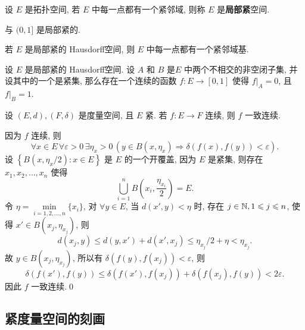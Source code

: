      \begin{Definition}[局部紧]\label{def:局部紧}
           设 $ E $ 是拓扑空间, 若 $ E $ 中每一点都有一个紧邻域, 则称 $ E $ 是\textbf{局部紧}空间.
     \end{Definition}

     \begin{Example}
          \R 与 $ (0, 1] $ 是局部紧的.
     \end{Example}

     \begin{Remark}
          若 $ E $ 是局部紧的 Hausdorff空间, 则 $ E $ 中每一点都有一个紧邻域基.
     \end{Remark}

     \begin{Theorem}[Urysohn引理]
           设 $ E $ 是局部紧的 Hausdorff空间. 设 $ A $ 和 $ B $ 是$ E $ 中两个不相交的非空闭子集, 并设其中的一个是紧集, 那么存在一个连续的函数 $ f:E\to[0,1] $ 使得 $ f|_{A}=0 $, 且 $ f|_{B}=1 $.
     \end{Theorem}

     \begin{Theorem}
           设 $ (E, d), (F, \delta) $ 是度量空间, 且 $ E $ 紧. 若 $ f:E\to F $ 连续, 则 $ f $ 一致连续.
     \end{Theorem}

     \begin{Proof}
          因为 $ f $ 连续, 则 
          \[
               \forall x\in E\,\forall \varepsilon>0\,\exists\eta_{x}>0\,(y\in B(x, \eta_{x})\Rightarrow \delta(f(x), f(y))<\varepsilon).
          \]
          设 $\left\{ B(x, \eta_{x}/2) : x\in E \right\}$ 是 $ E $ 的一个开覆盖, 因为 $ E $ 是紧集, 则存在 $ x_{1}, x_{2},\dots,x_{n} $ 使得
          \[
               \bigcup_{i=1}^{n} B\left(x_{i}, \frac{\eta_{x_{i}}}{2}\right)=E.
          \]
          令 $ \eta=\min\limits_{i=1, 2, \dots, n}\{ x_{i} \} $, 对 $ \forall y\in E $, 当 $ d(x', y)<\eta $ 时, 存在 $ j\in\mathbb{N}, 1\leqslant j\leqslant n $, 使得 $ x'\in B(x_{j}, \eta_{x_{j}}) $, 则
          \[
               d(x_{j}, y) \leqslant d(y, x')+d(x', x_{j})\leqslant\eta_{x_{j}}/2+\eta<\eta_{x_{j}}.
          \]
          故 $ y\in B(x_{j}, \eta_{x_{j}}) $, 所以有 $ \delta(f(y), f(x_{j}))<\varepsilon $, 则
          \[
               \delta(f(x'), f(y))\leqslant \delta(f(x'), f(x_{j}))+\delta(f(x_{j}), f(y))<2\varepsilon.
          \]
          因此 $ f $ 一致连续.\qed
     \end{Proof}

     \subsection{紧度量空间的刻画}
    
